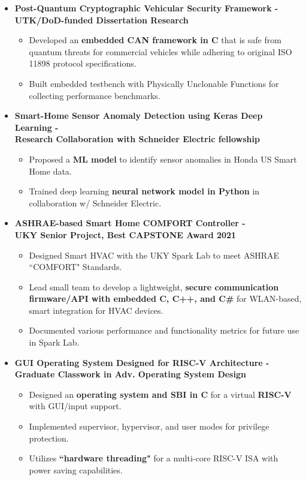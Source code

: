 \documentclass[line,margin,9pt]{res}
\begin{document}
\begin{resume}
\begin{itemize}
\item \textbf{Post-Quantum Cryptographic Vehicular Security Framework - \\
	\small{UTK/DoD-funded Dissertation Research}} 
\begin{itemize}
\item Developed an \textbf{embedded CAN framework in C} that is safe from quantum threats for commercial vehicles while adhering to original ISO 11898 protocol specifications.
\item Built embedded testbench with Physically Unclonable Functions for collecting performance benchmarks.
\end{itemize}

\item \textbf{Smart-Home Sensor Anomaly Detection using Keras Deep Learning - \\
	\small{Research Collaboration with Schneider Electric fellowship}}  
\begin{itemize}
\item Proposed a \textbf{ML model} to identify sensor anomalies in Honda US Smart Home data.
\item Trained deep learning \textbf{neural network model in Python} in collaboration w/ Schneider Electric.
\end{itemize}

\item \textbf{ASHRAE-based Smart Home COMFORT Controller - \\
	\small{UKY Senior Project, Best CAPSTONE Award 2021}}
\begin{itemize}
\item Designed Smart HVAC with the UKY Spark Lab to meet ASHRAE ``COMFORT" Standards.
\item Lead small team to develop a lightweight, \textbf{secure communication firmware/API with embedded C, C++, and C\#} for WLAN-based, smart integration for HVAC devices.
\item Documented various performance and functionality metrics for future use in Spark Lab.
\end{itemize}

\item \textbf{GUI Operating System Designed for RISC-V Architecture - \\
	\small{Graduate Classwork in Adv. Operating System Design}} 
\begin{itemize}
\item Designed an \textbf{operating system and SBI in C} for a virtual \textbf{RISC-V} with GUI/input support.
\item Implemented supervisor, hypervisor, and user modes for privilege protection.
\item Utilizes \textbf{``hardware threading"} for a multi-core RISC-V ISA with power saving capabilities.
\end{itemize}


\end{itemize}
\end{resume}
\end{document}
